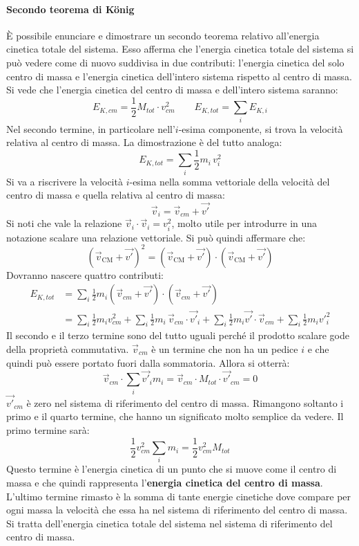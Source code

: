 \documentclass[10pt,a4paper]{book}
\begin{document}
\paragraph{Secondo teorema di K\"onig} È possibile enunciare e dimostrare un secondo teorema relativo all'energia cinetica totale del sistema. Esso afferma che l'energia cinetica totale del sistema si può vedere come di nuovo suddivisa in due contributi: l'energia cinetica del solo centro di massa e l'energia cinetica dell'intero sistema rispetto al centro di massa. Si vede che l'energia cinetica del centro di massa e dell'intero sistema saranno:
\[
	E_{K,cm} = \frac{1}{2} M_{tot}\cdot v_{cm}^2 \qquad E_{K,tot} = \sum_i E_{K,i}
\]
Nel secondo termine, in particolare nell'$i$-esima componente, si trova la velocità relativa al centro di massa. La dimostrazione è del tutto analoga:
\[
	E_{K,tot} = \sum_i \frac{1}{2} m_i\,v_i^2
\]
Si va a riscrivere la velocità $i$-esima nella somma vettoriale della velocità del centro di massa e quella relativa al centro di massa:
\[
\vec{v}_i = \vec{v}_{cm} + \vec{v'}
\]
Si noti che vale la relazione $\vec{v}_i \cdot \vec{v}_i = v_i^2$, molto utile per introdurre in una notazione scalare una relazione vettoriale. Si può quindi affermare che:
\[ (\vec{v}_\text{CM}+\vec{v'})^2= (\vec{v}_\text{CM}+\vec{v'}) \cdot (\vec{v}_\text{CM}+\vec{v'}) \]
Dovranno nascere quattro contributi:
\begin{equation*}
	\begin{aligned}
		E_{K,tot} &= \sum_i \frac{1}{2} m_i (\vec{v}_{cm}+\vec{v'}  ) \cdot (\vec{v}_{cm}+\vec{v'}  ) \\
		&= \sum_i \frac{1}{2} m_i v_{cm}^2 + \sum_i \frac{1}{2} m_i\,\vec{v}_{cm}\cdot \vec{v'}_i + \sum_i \frac{1}{2} m_i \vec{v'} \cdot \vec{v}_{cm} + \sum_i \frac{1}{2} m_i v'^2_i
	\end{aligned}
\end{equation*}
Il secondo e il terzo termine sono del tutto uguali perché il prodotto scalare gode della proprietà commutativa. $\vec{v}_{cm}$ è un termine che non ha un pedice $i$ e che quindi può essere portato fuori dalla sommatoria. Allora si otterrà:
\[
	\vec{v}_{cm} \cdot \sum_i \vec{v'}_i m_i = \vec{v}_{cm}\cdot M_{tot}\cdot \vec{v'}_{cm} = 0
\]
$\vec{v'}_{cm}$ è zero nel sistema di riferimento del centro di massa.
Rimangono soltanto i primo e il quarto termine, che hanno un significato molto semplice da vedere. Il primo termine sarà:
\[
	\frac{1}{2} v_{cm}^2 \sum_i m_i = \frac{1}{2} v_{cm}^2 M_{tot}
\]
Questo termine è l'energia cinetica di un punto che si muove come il centro di massa e che quindi rappresenta l'\textbf{energia cinetica del centro di massa}.
L'ultimo termine rimasto è la somma di tante energie cinetiche dove compare per ogni massa la velocità che essa ha nel sistema di riferimento del centro di massa. Si tratta dell'energia cinetica totale del sistema nel sistema di riferimento del centro di massa.
\end{document}
